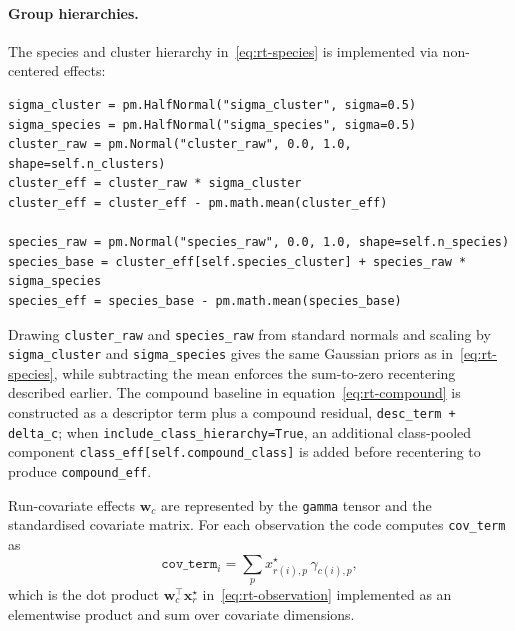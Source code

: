 \documentclass[11pt]{article}
\begin{document}
\paragraph{Group hierarchies.}
The species and cluster hierarchy in~\eqref{eq:rt-species} is implemented via
non-centered effects:
\begin{verbatim}
sigma_cluster = pm.HalfNormal("sigma_cluster", sigma=0.5)
sigma_species = pm.HalfNormal("sigma_species", sigma=0.5)
cluster_raw = pm.Normal("cluster_raw", 0.0, 1.0, shape=self.n_clusters)
cluster_eff = cluster_raw * sigma_cluster
cluster_eff = cluster_eff - pm.math.mean(cluster_eff)

species_raw = pm.Normal("species_raw", 0.0, 1.0, shape=self.n_species)
species_base = cluster_eff[self.species_cluster] + species_raw * sigma_species
species_eff = species_base - pm.math.mean(species_base)
\end{verbatim}
Drawing \texttt{cluster\_raw} and \texttt{species\_raw} from standard normals and
scaling by \texttt{sigma\_cluster} and \texttt{sigma\_species} gives the same
Gaussian priors as in~\eqref{eq:rt-species}, while subtracting the mean enforces the
sum-to-zero recentering described earlier. The compound baseline in
equation~\eqref{eq:rt-compound} is constructed as a descriptor term plus a compound residual,
\texttt{desc\_term + delta\_c}; when \texttt{include\_class\_hierarchy=True}, an additional
class-pooled component \texttt{class\_eff[self.compound\_class]} is added before recentering to
produce \texttt{compound\_eff}.

Run-covariate effects $\bm{w}_c$ are represented by the \texttt{gamma} tensor and
the standardised covariate matrix. For each observation the code computes
\texttt{cov\_term} as
\[
  \texttt{cov\_term}_i
  =
  \sum_{p}
    x^{\star}_{r(i),p}\,
    \gamma_{c(i),p},
\]
which is the dot product $\bm{w}_c^{\top}\bm{x}^{\star}_r$ in~\eqref{eq:rt-observation}
implemented as an elementwise product and sum over covariate dimensions.
\end{document}
